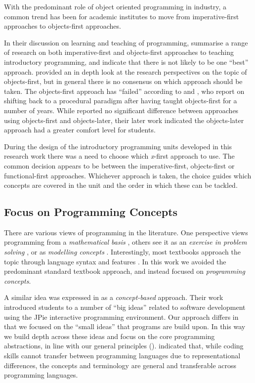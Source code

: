 With the predominant role of object oriented programming in industry, a common trend has been for academic institutes to move from imperative-first approaches to objects-first approaches. 

In their discussion on learning and teaching of programming, \citet{Robins:2003} summarise a range of research on both imperative-first and objects-first approaches to teaching introductory programming, and indicate that there is not likely to be one ``best'' approach. \citet{Lister:2006a} provided an in depth look at the research perspectives on the topic of objects-first, but in general there is no consensus on which approach should be taken. The objects-first approach has ``failed'' according to \citet{Astrachan:2005} and \citet{Reges:2006}, who report on shifting back to a procedural paradigm after having taught objects-first for a number of years. While \citet{Ehlert:2009} reported no significant difference between approaches using objects-first and objects-later, their later work \cite{Ehlert:2010} indicated the objects-later approach had a greater comfort level for students. 

During the design of the introductory programming units developed in this research work there was a need to choose which \emph{x}-first approach to use. The common decision appears to be between the imperative-first, objects-first or functional-first approaches. Whichever approach is taken, the choice guides which concepts are covered in the unit and the order in which these can be tackled.


\subsection{Focus on Programming Concepts} %
\label{sub:focus_on_programming_concepts}

There are various views of programming in the literature. One perspective views programming from a \emph{mathematical basis} \cite{Denning:1989,Dijkstra:1989,Hoare:1969}, others see it as an \emph{exercise in problem solving} \cite{Palumbo:1990}, or as \emph{modelling concepts} \cite{Bennedsen:2004}. Interestingly, most textbooks approach the topic through language syntax and features \cite{Robins:2003}. In this work we avoided the predominant standard textbook approach, and instead focused on \emph{programming concepts}.

A similar idea was expressed in \citet{Goldman:2004} as a \emph{concept-based} approach. Their work introduced students to a number of ``big ideas'' related to software development using the JPie interactive programming environment. Our approach differs in that we focused on the ``small ideas'' that programs are build upon. In this way we build depth across these ideas and focus on the core programming abstractions, in line with our general principles (). \citet{Anderson:1995} indicated that, while coding skills cannot transfer between programming languages due to representational differences, the concepts and terminology are general and transferable across programming languages.


